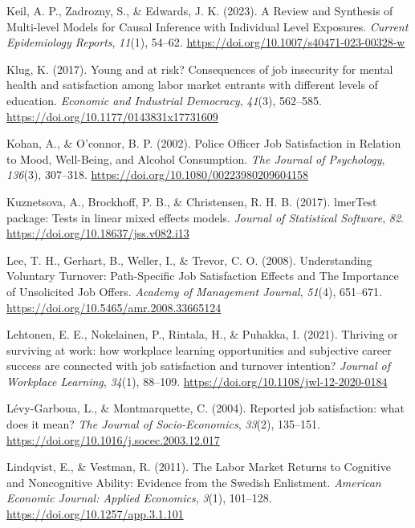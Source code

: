 \documentclass[
]{interact}
\newlength{\cslhangindent}
\newenvironment{CSLReferences}[2] %
 {\begin{list}{}{%
  \setlength{\itemindent}{0pt}
  \setlength{\leftmargin}{0pt}
  \setlength{\parsep}{0pt}
  \ifodd #1
   \setlength{\leftmargin}{\cslhangindent}
   \setlength{\itemindent}{-1\cslhangindent}
  \fi
  \setlength{\itemsep}{#2\baselineskip}}}
 {\end{list}}
\begin{document}
\begin{CSLReferences}{1}{0}
Keil, A. P., Zadrozny, S., \& Edwards, J. K. (2023). A Review and
Synthesis of Multi-level Models for Causal Inference with Individual
Level Exposures. \emph{Current Epidemiology Reports}, \emph{11}(1),
54--62. \url{https://doi.org/10.1007/s40471-023-00328-w}

Klug, K. (2017). Young and at risk? Consequences of job insecurity for
mental health and satisfaction among labor market entrants with
different levels of education. \emph{Economic and Industrial Democracy},
\emph{41}(3), 562--585. \url{https://doi.org/10.1177/0143831x17731609}

Kohan, A., \& O'connor, B. P. (2002). Police Officer Job Satisfaction in
Relation to Mood, Well-Being, and Alcohol Consumption. \emph{The Journal
of Psychology}, \emph{136}(3), 307--318.
\url{https://doi.org/10.1080/00223980209604158}

Kuznetsova, A., Brockhoff, P. B., \& Christensen, R. H. B. (2017).
{\textbraceleft}lmerTest{\textbraceright} package: Tests in linear mixed
effects models. \emph{Journal of Statistical Software}, \emph{82}.
\url{https://doi.org/10.18637/jss.v082.i13}

Lee, T. H., Gerhart, B., Weller, I., \& Trevor, C. O. (2008).
Understanding Voluntary Turnover: Path-Specific Job Satisfaction Effects
and The Importance of Unsolicited Job Offers. \emph{Academy of
Management Journal}, \emph{51}(4), 651--671.
\url{https://doi.org/10.5465/amr.2008.33665124}

Lehtonen, E. E., Nokelainen, P., Rintala, H., \& Puhakka, I. (2021).
Thriving or surviving at work: how workplace learning opportunities and
subjective career success are connected with job satisfaction and
turnover intention? \emph{Journal of Workplace Learning}, \emph{34}(1),
88--109. \url{https://doi.org/10.1108/jwl-12-2020-0184}

Lévy-Garboua, L., \& Montmarquette, C. (2004). Reported job
satisfaction: what does it mean? \emph{The Journal of Socio-Economics},
\emph{33}(2), 135--151.
\url{https://doi.org/10.1016/j.socec.2003.12.017}

Lindqvist, E., \& Vestman, R. (2011). The Labor Market Returns to
Cognitive and Noncognitive Ability: Evidence from the Swedish
Enlistment. \emph{American Economic Journal: Applied Economics},
\emph{3}(1), 101--128. \url{https://doi.org/10.1257/app.3.1.101}


\end{CSLReferences}
\end{document}
